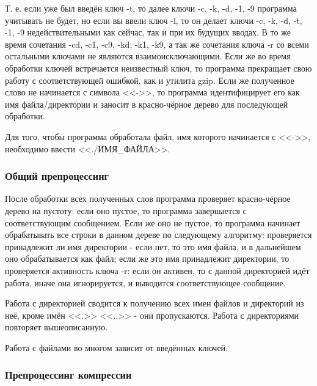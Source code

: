 \documentclass[12pt]{article}
\begin{document}
Т. е. если уже был введён ключ -t, то далее ключи -c, -k, -d, -1, -9 программа учитывать не будет, но если вы ввели ключ -l, то он делает ключи -c, -k, -d, -t, -1, -9 недействительными как сейчас, так и при их будущих вводах. В то же время сочетания -cd, -c1, -c9, -kd, -k1, -k9, а так же сочетания ключа -r со всеми остальными ключами не являются взаимоисключающими. Если же во время обработки ключей встречается неизвестный ключ, то программа прекращает свою работу с соответствующей ошибкой, как и утилита gzip.
Если же полученное слово не начинается с символа <<->>, то программа идентифицирует его как имя файла/директории и заносит в красно-чёрное дерево для последующей обработки.

Для того, чтобы программа обработала файл, имя которого начинается с <<->>, необходимо ввести <<./ИМЯ\_ФАЙЛА>>.

\subsubsection*{Общий препроцессинг}

После обработки всех полученных слов программа проверяет красно-чёрное дерево на пустоту: если оно пустое, то программа завершается с соответствующим сообщением. Если же оно не пустое, то программа начинает обрабатывать все строки в данном дереве по следующему алгоритму: проверяется принадлежит ли имя директории - если нет, то это имя файла, и в дальнейшем оно обрабатывается как файл; если же это имя принадлежит директории, то проверяется активность ключа -r: если он активен, то с данной директорией идёт работа, иначе она игнорируется, и выводится соответствующее сообщение.

Работа с директорией сводится к получению всех имен файлов и директорий из неё, кроме имён <<.>> <<..>> - они пропускаются. Работа с директориями повторяет вышеописанную.

Работа с файлами во многом зависит от введённых ключей. 

\subsubsection*{Препроцессинг компрессии}
\end{document}
